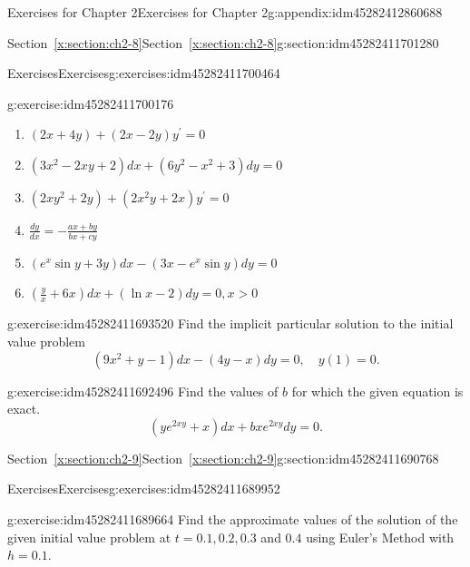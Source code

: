 \documentclass[oneside,10pt,]{book}
\numberwithin{equation}{section}
\numberwithin{equation}{section}
\begin{document}
\begin{appendixptx}{Exercises for Chapter 2}{}{Exercises for Chapter 2}{}{}{g:appendix:idm45282412860688}
\begin{sectionptx}{Section~\ref*{x:section:ch2-8}}{}{Section~\ref*{x:section:ch2-8}}{}{}{g:section:idm45282411701280}
\begin{exercises-subsection-numberless}{Exercises}{}{Exercises}{}{}{g:exercises:idm45282411700464}
\begin{divisionexercise}{1}{}{}{g:exercise:idm45282411700176}
\begin{enumerate}[label=(\alph*)]
\item{}\({\displaystyle \left(2x+4y\right)+\left(2x-2y\right)y^{\prime}=0}\)%
\item{}\(\left(3x^{2}-2xy+2\right)dx+\left(6y^{2}-x^{2}+3\right)dy=0\)%
\item{}\({\displaystyle \left(2xy^{2}+2y\right)+\left(2x^{2}y+2x\right)y^{\prime}=0}\)%
\item{}\({\displaystyle \frac{dy}{dx}=-\frac{ax+by}{bx+cy}}\)%
\item{}\({\displaystyle \left(e^{x}\sin y+3y\right)dx-\left(3x-e^{x}\sin y\right)dy=0}\)%
\item{}\({\displaystyle \left(\frac{y}{x}+6x\right)dx+\left(\ln x-2\right)dy=0},\)\(x>0\)%
\end{enumerate}
\end{divisionexercise}%
\begin{divisionexercise}{2}{}{}{g:exercise:idm45282411693520}%
Find the implicit particular solution to the initial value problem%
\begin{equation*}
\left(9x^{2}+y-1\right)dx-\left(4y-x\right)dy=0,\,\,\,\,\,\,y(1)=0.
\end{equation*}
\end{divisionexercise}%
\begin{divisionexercise}{3}{}{}{g:exercise:idm45282411692496}%
Find the values of \(b\) for which the given equation is exact.%
\begin{equation*}
\left(ye^{2xy}+x\right)dx+bxe^{2xy}dy=0.
\end{equation*}
\end{divisionexercise}%
\end{exercises-subsection-numberless}
\end{sectionptx}
%
%
\typeout{************************************************}
\typeout{************************************************}
%
\begin{sectionptx}{Section~\ref*{x:section:ch2-9}}{}{Section~\ref*{x:section:ch2-9}}{}{}{g:section:idm45282411690768}
%
%
\typeout{************************************************}
\typeout{************************************************}
%
\begin{exercises-subsection-numberless}{Exercises}{}{Exercises}{}{}{g:exercises:idm45282411689952}
\begin{divisionexercise}{1}{}{}{g:exercise:idm45282411689664}%
Find the approximate values of the solution of the given initial value problem at \(t=0.1,0.2,0.3\) and \(0.4\) using Euler's Method with \(h=0.1\).%

\end{divisionexercise}
\end{exercises-subsection-numberless}
\end{sectionptx}
\end{appendixptx}
\end{document}
